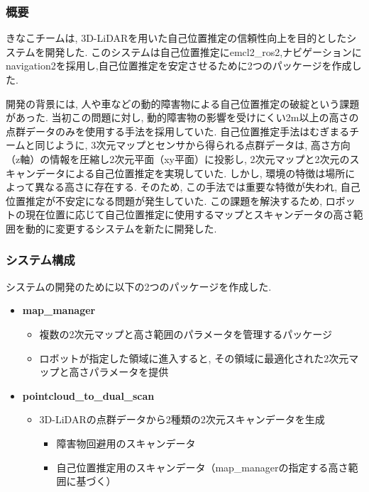 \subsubsection{概要}
きなこチームは, 3D-LiDARを用いた自己位置推定の信頼性向上を目的としたシステムを開発した. 
このシステムは自己位置推定にemcl2\_ros2,ナビゲーションにnavigation2を採用し,自己位置推定を安定させるために2つのパッケージを作成した. 

開発の背景には, 人や車などの動的障害物による自己位置推定の破綻という課題があった. 
当初この問題に対し, 動的障害物の影響を受けにくい2m以上の高さの点群データのみを使用する手法を採用していた. 
自己位置推定手法はむぎまるチームと同じように, 3次元マップとセンサから得られる点群データは, 高さ方向（z軸）の情報を圧縮し2次元平面（xy平面）に投影し, 2次元マップと2次元のスキャンデータによる自己位置推定を実現していた. 
しかし, 環境の特徴は場所によって異なる高さに存在する. 
そのため, この手法では重要な特徴が失われ, 自己位置推定が不安定になる問題が発生していた. 
この課題を解決するため, ロボットの現在位置に応じて自己位置推定に使用するマップとスキャンデータの高さ範囲を動的に変更するシステムを新たに開発した. 


\subsubsection{システム構成}
システムの開発のために以下の2つのパッケージを作成した. 

\begin{itemize}
  \item \textbf{map\_manager}
    \begin{itemize}
      \item 複数の2次元マップと高さ範囲のパラメータを管理するパッケージ
      \item ロボットが指定した領域に進入すると, その領域に最適化された2次元マップと高さパラメータを提供
    \end{itemize}
  \item \textbf{pointcloud\_to\_dual\_scan}
    \begin{itemize}
      \item 3D-LiDARの点群データから2種類の2次元スキャンデータを生成
        \begin{itemize}
          \item 障害物回避用のスキャンデータ
          \item 自己位置推定用のスキャンデータ（map\_managerの指定する高さ範囲に基づく）
        \end{itemize}
    \end{itemize}
\end{itemize}


